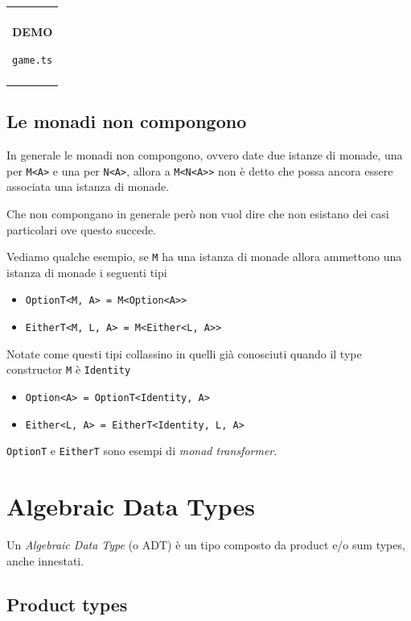 \documentclass[12pt]{article}
\newenvironment{demo}
    {\begin{center}
    \begin{tabular}{|p{0.9\textwidth}|}
    \hline\\
    }
    {
    \\\\\hline
    \end{tabular}
    \end{center}
    }
\begin{document}
\begin{demo}
\begin{center}
\textbf{DEMO}

\texttt{game.ts}
\end{center}
\end{demo}

\subsection{Le monadi non compongono}

In generale le monadi non compongono, ovvero date due istanze di monade, una per \texttt{M<A>} e una per \texttt{N<A>},
allora a \texttt{M<N<A>>} non è detto che possa ancora essere associata una istanza di monade.

Che non compongano in generale però non vuol dire che non esistano dei casi particolari ove questo succede.

Vediamo qualche esempio, se \texttt{M} ha una istanza di monade allora ammettono una istanza di monade i seguenti tipi

\begin{itemize}
  \item \texttt{OptionT<M, A> = M<Option<A>>}
  \item \texttt{EitherT<M, L, A> = M<Either<L, A>>}
\end{itemize}

Notate come questi tipi collassino in quelli già conosciuti quando il type constructor \texttt{M} è \texttt{Identity}

\begin{itemize}
  \item \texttt{Option<A> = OptionT<Identity, A>}
  \item \texttt{Either<L, A> = EitherT<Identity, L, A>}
\end{itemize}

\texttt{OptionT} e \texttt{EitherT} sono esempi di \emph{monad transformer}.

\newpage

\section{Algebraic Data Types}

Un \emph{Algebraic Data Type} (o ADT) è un tipo composto da product e/o sum types, anche innestati.

\subsection{Product types}
\end{document}
